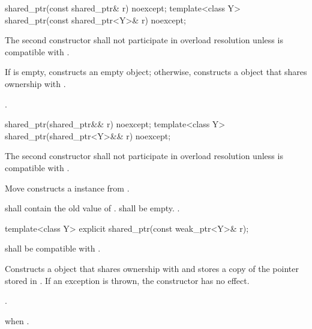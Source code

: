 %
\begin{itemdecl}
shared_ptr(const shared_ptr& r) noexcept;
template<class Y> shared_ptr(const shared_ptr<Y>& r) noexcept;
\end{itemdecl}

\begin{itemdescr}
\pnum\remarks
The second constructor shall not participate in overload resolution unless
 is compatible with .

\pnum\effects  If  is empty, constructs
an empty  object; otherwise, constructs
a  object that shares ownership with .

\pnum\postconditions  {}.
\end{itemdescr}

%
\begin{itemdecl}
shared_ptr(shared_ptr&& r) noexcept;
template<class Y> shared_ptr(shared_ptr<Y>&& r) noexcept;
\end{itemdecl}

\begin{itemdescr}
\pnum
\remarks The second constructor shall not participate in overload resolution unless
 is compatible with .

\pnum
\effects Move constructs a  instance from .

\pnum
\postconditions {} shall contain the old value of
.  shall be empty. .
\end{itemdescr}

%
%
\begin{itemdecl}
template<class Y> explicit shared_ptr(const weak_ptr<Y>& r);
\end{itemdecl}

\begin{itemdescr}
\pnum\requires {} shall be compatible with .

\pnum\effects  Constructs a  object that shares ownership with
 and stores a copy of the pointer stored in .
If an exception is thrown, the constructor has no effect.

\pnum\postconditions  {}.

\pnum\throws  {} when .
\end{itemdescr}

